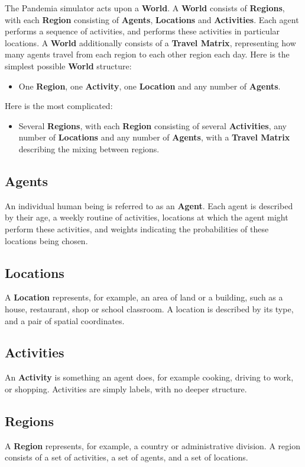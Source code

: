\documentclass[10pt,letterpaper]{article}
\begin{document}
The Pandemia simulator acts upon a \textbf{World}. A \textbf{World} consists of \textbf{Regions}, with each \textbf{Region} consisting of \textbf{Agents}, \textbf{Locations} and \textbf{Activities}. Each agent performs a sequence of activities, and performs these activities in particular locations. A \textbf{World} additionally consists of a \textbf{Travel Matrix}, representing how many agents travel from each region to each other region each day. Here is the simplest possible \textbf{World} structure:
\begin{itemize}
\item One \textbf{Region}, one \textbf{Activity}, one \textbf{Location} and any number of \textbf{Agents}.
\end{itemize}
Here is the most complicated:
\begin{itemize}
\item Several \textbf{Regions}, with each \textbf{Region} consisting of several \textbf{Activities}, any number of \textbf{Locations} and any number of \textbf{Agents}, with a \textbf{Travel Matrix} describing the mixing between regions.
\end{itemize}

\subsection{Agents}
An individual human being is referred to as an \textbf{Agent}. Each agent is described by their age, a weekly routine of activities, locations at which the agent might perform these activities, and weights indicating the probabilities of these locations being chosen.

\subsection{Locations}
A \textbf{Location} represents, for example, an area of land or a building, such as a house, restaurant, shop or school classroom. A location is described by its type, and a pair of spatial coordinates.

\subsection{Activities}
An \textbf{Activity} is something an agent does, for example cooking, driving to work, or shopping. Activities are simply labels, with no deeper structure.

\subsection{Regions}
A \textbf{Region} represents, for example, a country or administrative division. A region consists of a set of activities, a set of agents, and a set of locations.
\end{document}
